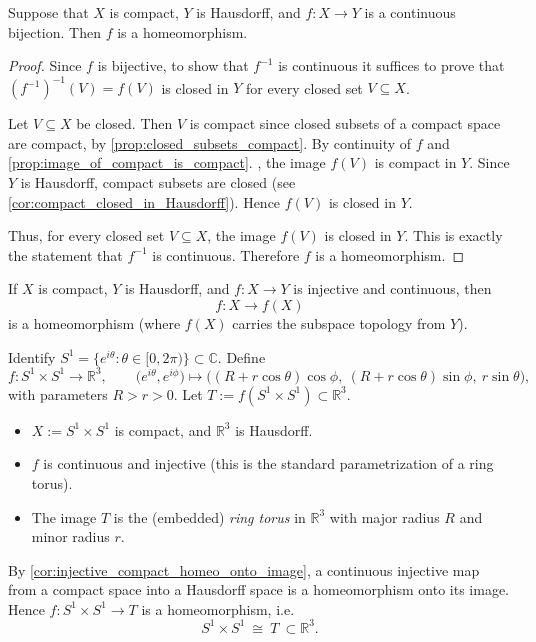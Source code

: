 \begin{theorem}\label{thm:compact_hausdorff_homeo}
Suppose that \(X\) is compact, \(Y\) is Hausdorff, and 
\(f : X \to Y\) is a continuous bijection. Then \(f\) is a homeomorphism.
\end{theorem}

\begin{proof}
Since \(f\) is bijective, to show that \(f^{-1}\) is continuous it suffices to prove that
\((f^{-1})^{-1}(V) = f(V)\) is closed in \(Y\) for every closed set \(V \subseteq X\).


Let \(V \subseteq X\) be closed. Then \(V\) is compact since closed subsets of a compact space are compact, by \autoref{prop:closed_subsets_compact}.  
By continuity of \(f\) and \autoref{prop:image_of_compact_is_compact}.  , the image \(f(V)\) is compact in \(Y\).
Since \(Y\) is Hausdorff, compact subsets are closed (see \autoref{cor:compact_closed_in_Hausdorff}).  
Hence \(f(V)\) is closed in \(Y\).

Thus, for every closed set \(V \subseteq X\), the image \(f(V)\) is closed in \(Y\).  
This is exactly the statement that \(f^{-1}\) is continuous. Therefore \(f\) is a homeomorphism.
\end{proof}

\begin{corollary}\label{cor:injective_compact_homeo_onto_image}
If \(X\) is compact, \(Y\) is Hausdorff, and \(f : X \to Y\) is injective and continuous, then
\[
f : X \longrightarrow f(X)
\]
is a homeomorphism (where \(f(X)\) carries the subspace topology from \(Y\)).
\end{corollary}

\begin{example}\label{ex:S1xS1_torus}
Identify \(S^{1}=\{e^{i\theta} : \theta\in[0,2\pi)\}\subset\mathbb{C}\).
Define
\[
f : S^{1}\times S^{1} \longrightarrow \mathbb{R}^{3},\qquad
\bigl(e^{i\theta},e^{i\phi}\bigr) \longmapsto
\bigl((R+r\cos\theta)\cos\phi,\ (R+r\cos\theta)\sin\phi,\ r\sin\theta\bigr),
\]
with parameters \(R>r>0\). Let \(T:=f(S^{1}\times S^{1})\subset\mathbb{R}^{3}\).

\begin{itemize}
\item \(X:=S^{1}\times S^{1}\) is compact, and \(\mathbb{R}^{3}\) is Hausdorff.
\item \(f\) is continuous and injective (this is the standard parametrization of a ring torus).
\item The image \(T\) is the (embedded) \emph{ring torus} in \(\mathbb{R}^{3}\) with major radius \(R\) and minor radius \(r\).
\end{itemize}

By \autoref{cor:injective_compact_homeo_onto_image}, a continuous injective map from a compact space into a Hausdorff space
is a homeomorphism onto its image. Hence \(f: S^{1}\times S^{1}\to T\) is a homeomorphism, i.e.
\[
S^{1}\times S^{1}\ \cong\ T\ \subset \mathbb{R}^{3}.
\]
\end{example}



